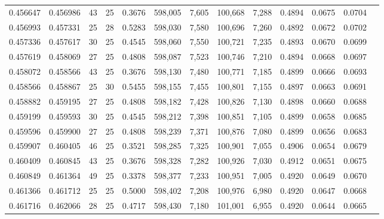 \begin{tabular}{rrrrrrrrrrrrr}
0.456647 & 0.456986 &    43 &  25 &                                     0.3676 & 598,005 &   7,605 & 100,668 &   7,288 & 0.4894 & 0.0675 & 0.0704 \\
0.456993 & 0.457331 &    25 &  28 &                                     0.5283 & 598,030 &   7,580 & 100,696 &   7,260 & 0.4892 & 0.0672 & 0.0702 \\
0.457336 & 0.457617 &    30 &  25 &                                     0.4545 & 598,060 &   7,550 & 100,721 &   7,235 & 0.4893 & 0.0670 & 0.0699 \\
0.457619 & 0.458069 &    27 &  25 &                                     0.4808 & 598,087 &   7,523 & 100,746 &   7,210 & 0.4894 & 0.0668 & 0.0697 \\
0.458072 & 0.458566 &    43 &  25 &                                     0.3676 & 598,130 &   7,480 & 100,771 &   7,185 & 0.4899 & 0.0666 & 0.0693 \\
0.458566 & 0.458867 &    25 &  30 &                                     0.5455 & 598,155 &   7,455 & 100,801 &   7,155 & 0.4897 & 0.0663 & 0.0691 \\
0.458882 & 0.459195 &    27 &  25 &                                     0.4808 & 598,182 &   7,428 & 100,826 &   7,130 & 0.4898 & 0.0660 & 0.0688 \\
0.459199 & 0.459593 &    30 &  25 &                                     0.4545 & 598,212 &   7,398 & 100,851 &   7,105 & 0.4899 & 0.0658 & 0.0685 \\
0.459596 & 0.459900 &    27 &  25 &                                     0.4808 & 598,239 &   7,371 & 100,876 &   7,080 & 0.4899 & 0.0656 & 0.0683 \\
0.459907 & 0.460405 &    46 &  25 &                                     0.3521 & 598,285 &   7,325 & 100,901 &   7,055 & 0.4906 & 0.0654 & 0.0679 \\
0.460409 & 0.460845 &    43 &  25 &                                     0.3676 & 598,328 &   7,282 & 100,926 &   7,030 & 0.4912 & 0.0651 & 0.0675 \\
0.460849 & 0.461364 &    49 &  25 &                                     0.3378 & 598,377 &   7,233 & 100,951 &   7,005 & 0.4920 & 0.0649 & 0.0670 \\
0.461366 & 0.461712 &    25 &  25 &                                     0.5000 & 598,402 &   7,208 & 100,976 &   6,980 & 0.4920 & 0.0647 & 0.0668 \\
0.461716 & 0.462066 &    28 &  25 &                                     0.4717 & 598,430 &   7,180 & 101,001 &   6,955 & 0.4920 & 0.0644 & 0.0665 \\

\end{tabular}
